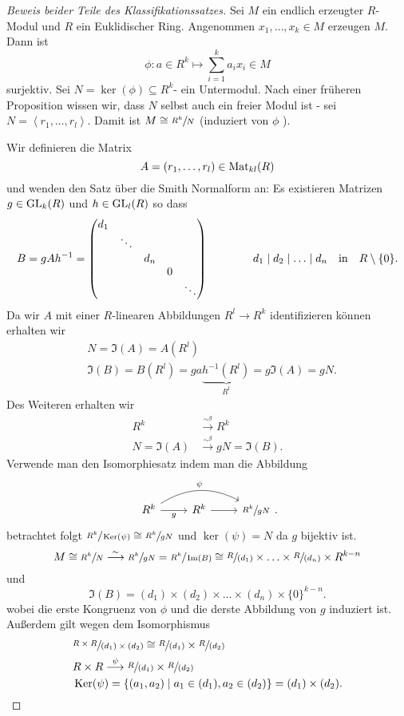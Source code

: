 \begin{proof}[Beweis beider Teile des Klassifikationssatzes]
	Sei $M$ ein endlich erzeugter $R$-Modul und $R$ ein Euklidischer Ring.
	Angenommen $x_1,\ldots,x_{k} \in M$ erzeugen $M$. Dann ist
	\[
	\phi: a \in R^{k} \mapsto \sum_{i=1}^{k} a_{i} x_{i} \in M
	\] 
	surjektiv. Sei $N = \ker(\phi) \subseteq R^{k}$- ein Untermodul. Nach einer früheren Proposition wissen wir, dass $N$ selbst
	auch ein freier Modul ist -  sei $N = \left< r_1,\ldots,r_{l} \right>$. Damit ist $M \cong \sfrac{R^{k}}{N}$ (induziert von $\phi$ ).

	Wir definieren die Matrix
	\[
		A = (r_1,\ldots,r_{l}) \in \operatorname{Mat}_{kl}(R)
	\] 
	und wenden den Satz über die Smith Normalform an: Es existieren Matrizen $g \in \operatorname{GL}_{k}(R)$ und $h \in \operatorname{GL}_{l}(R)$ so dass
	\[
	B = g A h^{-1} = \begin{pmatrix} 
		d_1 \\
		& \ddots \\
		& & d_{n} \\
		& & & 0 \\
		& & & & \ddots
	\end{pmatrix} \qquad \qquad d_1 \mid d_2 \mid \ldots \mid d_{n} \qq{in} R \setminus \{0\}  
	.\] 
	Da wir $A$ mit einer $R$-linearen Abbildungen $R^{l} \to R^{k}$ identifizieren können erhalten wir
	\begin{align*}
		&N = \Im(A) = A(R^{l})\\
		&\Im(B) = B(R^{l}) = g a \underbrace{h ^{-1}(R^{l})}_{R^{l}} = g \Im(A) = g N
	.\end{align*}
	Des Weiteren erhalten wir
	\begin{align*}
		R^{k} &\overset{\sim^{g}}{\longrightarrow} R^{k}\\
		N = \Im(A) &\overset{\sim^{g}}{\longrightarrow} g N = \Im(B)
	.\end{align*}
	Verwende man den Isomorphiesatz indem man die Abbildung
	\[
		\begin{tikzcd}
			R^k \arrow[r, "g"'] \arrow[rr, "\psi", bend left] & R^k \arrow[r] & \sfrac{R^k}{gN}
		\end{tikzcd}
	.\] 
	betrachtet folgt $\sfrac{R^{k}}{\operatorname{Ker}(\psi)} \cong \sfrac{R^{k}}{gN}$ und $\ker(\psi) = N$ da $g$ bijektiv ist.
	\[
		M \cong \sfrac{R^{k}}{N} \overset{\sim}{\longrightarrow} \sfrac{R^{k}}{gN} = \sfrac{R^{k}}{\Im(B)} \cong \sfrac{R}{(d_1)} \times  \ldots \times \sfrac{R}{(d_{n})} \times  R^{k-n}
	\] 
	und
	\[
		\Im(B) = (d_1) \times (d_2) \times \ldots \times (d_{n}) \times  \{0\}^{k-n}
	.\]
	wobei die erste Kongruenz von $\phi$ und die derste Abbildung von  $g$ induziert ist.
	Außerdem gilt wegen dem Isomorphismus
	\begin{align*}
		&\sfrac{R \times R}{(d_1) \times (d_2)} \cong \sfrac{R}{(d_1)} \times \sfrac{R}{(d_2)}\\
		&R \times R \overset{\psi}{\longrightarrow} \sfrac{R}{(d_1)} \times \sfrac{R}{(d_2)}\\
		&\operatorname{Ker}(\psi) = \{(a_1,a_2) \mid a_1 \in (d_1), a_2 \in (d_2)\} = (d_1) \times (d_2)
	.\end{align*} 
\end{proof}

